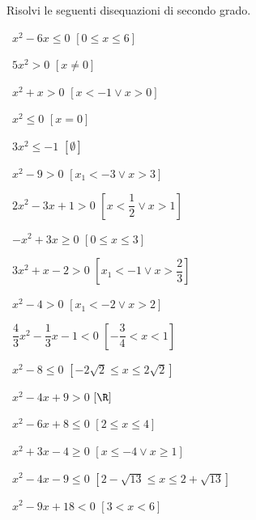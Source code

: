 \begin{esercizio}[*]
 \label{ese:4.1}
Risolvi le seguenti disequazioni di secondo grado.
\vspace{\dy}
\begin{htmulticols}{2}
 \begin{enumeratea}
 \item~\(x^2-6x\le 0\) \hfill \(\left[0\le x\le 6\right]\)
 \item~\(5x^2>0\) \hfill \(\left[x\neq 0\right]\)
 \item~\(x^2+x>0\) \hfill \(\left[x<-1\vee x>0\right]\)
 \item~\(x^2\le 0\) \hfill \(\left[x=0\right]\)
 \item~\(3x^2\le -1\) \hfill \(\left[\emptyset \right]\)
 \item~\(x^2-9>0\) \hfill \(\left[x_1<-3\vee x>3\right]\)
 \item~\(2x^2-3x+1>0\) \hfill \(\left[x<\dfrac 1 2\vee x>1\right]\)
 \item~\(-x^2+3x\ge 0\) \hfill \(\left[0\le x\le 3\right]\)
 \item~\(3x^2+x-2>0\) \hfill \(\left[x_1<-1\vee x>\dfrac 2 3\right]\)
 \item~\(x^2-4>0\) \hfill \(\left[x_1<-2\vee x>2\right]\)
 \item~\(\dfrac 4 3x^2-\dfrac 1 3x-1<0\) \hfill \(\left[-\dfrac 3 
4<x<1\right]\)
 \item~\(x^2-8\le 0\) \hfill \(\left[-2\sqrt 2\le x\le 2\sqrt 2\right]\)
 \item~\(x^2-4x+9>0\) \hfill \(\left[\R\right]\)
 \item~\(x^2-6x+8\le 0\) \hfill \(\left[2\le x\le 4\right]\)
 \item~\(x^2+3x-4\ge 0\) \hfill \(\left[x\le -4\vee x\ge 1\right]\)
 \item~\(x^2-4x-9\le 0\) \hfill \(\left[2-\sqrt{13}\le x\le 
2+\sqrt{13}\right]\)
 \item~\(x^2-9x+18<0\) \hfill \(\left[3<x<6\right]\)
 \end{enumeratea}
 \end{htmulticols}
\end{esercizio}

